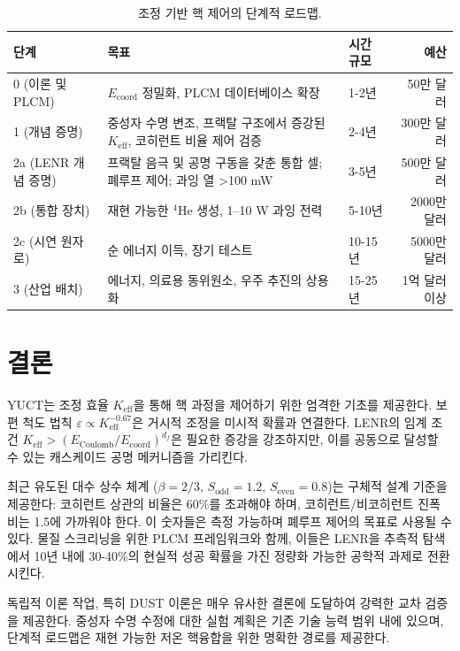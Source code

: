 \documentclass[11pt,a4paper]{article}
\theoremstyle{remark}
\newcommand{\Keff}{K_{\mathrm{eff}}}
\newcommand{\df}{d_{\!f}}
\newcommand{\Sodd}{S_{\mathrm{odd}}}
\newcommand{\Seven}{S_{\mathrm{even}}}
\begin{document}
	\begin{table}[htbp]
		\centering
		\caption{조정 기반 핵 제어의 단계적 로드맵.}
		\label{tab:roadmap}
		\small
		\begin{tabular}{l p{5cm} l r}
			\toprule
			\textbf{단계} & \textbf{목표} & \textbf{시간 규모} & \textbf{예산} \\
			\midrule
			0 (이론 및 PLCM) & \(E_{\mathrm{coord}}\) 정밀화, PLCM 데이터베이스 확장 & 1-2년 & 50만 달러 \\
			1 (개념 증명) & 중성자 수명 변조, 프랙탈 구조에서 증강된 \(\Keff\), 코히런트 비율 제어 검증 & 2-4년 & 300만 달러 \\
			2a (LENR 개념 증명) & 프랙탈 음극 및 공명 구동을 갖춘 통합 셀; 폐루프 제어; 과잉 열 >100 mW & 3-5년 & 500만 달러 \\
			2b (통합 장치) & 재현 가능한 \(^4\)He 생성, 1–10 W 과잉 전력 & 5-10년 & 2000만 달러 \\
			2c (시연 원자로) & 순 에너지 이득, 장기 테스트 & 10-15년 & 5000만 달러 \\
			3 (산업 배치) & 에너지, 의료용 동위원소, 우주 추진의 상용화 & 15-25년 & 1억 달러 이상 \\
			\bottomrule
		\end{tabular}
	\end{table}
	
	\section{결론}
	\label{sec:conclusion}
	
	YUCT는 조정 효율 \(\Keff\)을 통해 핵 과정을 제어하기 위한 엄격한 기초를 제공한다. 보편 척도 법칙 \(\varepsilon \propto \Keff^{-0.67}\)은 거시적 조정을 미시적 확률과 연결한다. LENR의 임계 조건 \(\Keff > (E_{\text{Coulomb}}/E_{\text{coord}})^{\df}\)은 필요한 증강을 강조하지만, 이를 공동으로 달성할 수 있는 캐스케이드 공명 메커니즘을 가리킨다.
	
	최근 유도된 대수 상수 체계 (\(\beta=2/3\), \(\Sodd=1.2\), \(\Seven=0.8\))는 구체적 설계 기준을 제공한다: 코히런트 상관의 비율은 60\%를 초과해야 하며, 코히런트/비코히런트 진폭 비는 1.5에 가까워야 한다. 이 숫자들은 측정 가능하며 폐루프 제어의 목표로 사용될 수 있다. 물질 스크리닝을 위한 PLCM 프레임워크와 함께, 이들은 LENR을 추측적 탐색에서 10년 내에 30-40\%의 현실적 성공 확률을 가진 정량화 가능한 공학적 과제로 전환시킨다.
	
	독립적 이론 작업, 특히 DUST 이론은 매우 유사한 결론에 도달하여 강력한 교차 검증을 제공한다. 중성자 수명 수정에 대한 실험 계획은 기존 기술 능력 범위 내에 있으며, 단계적 로드맵은 재현 가능한 저온 핵융합을 위한 명확한 경로를 제공한다.
	
\end{document}
